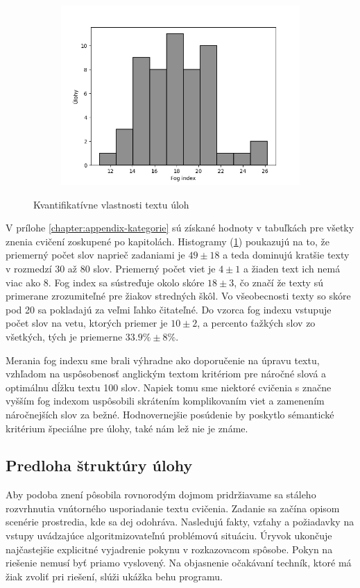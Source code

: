 \begin{figure}[h]
\begin{subfigure}[b]{0.32\textwidth}
\includegraphics[width=\textwidth]{assets/fog.png}
\end{subfigure}
\hfill
\caption{Kvantifikatívne vlastnosti textu úloh}
\label{fig:text-metrics}
\end{figure}

V prílohe \ref{chapter:appendix-kategorie} sú získané hodnoty v tabuľkách pre všetky znenia cvičení zoskupené po kapitolách. Histogramy (\ref{fig:text-metrics}) poukazujú na to, že priemerný počet slov naprieč zadaniami je $49 \pm 18$ a teda dominujú kratšie texty v rozmedzí $30$ až $80$ slov. Priemerný počet viet je $4 \pm 1$ a žiaden text ich nemá viac ako $8$. Fog index sa sústreďuje okolo skóre $18 \pm 3$, čo značí že texty sú primerane zrozumiteľné pre žiakov stredných škôl. Vo všeobecnosti texty so skóre pod 20 sa pokladajú za veľmi ľahko čitateľné. Do vzorca fog indexu vstupuje počet slov na vetu, ktorých priemer je $10 \pm 2$, a percento ťažkých slov zo všetkých, tých je priemerne $33.9\% \pm 8\%$.

Merania fog indexu sme brali výhradne ako doporučenie na úpravu textu, vzhľadom na uspôsobenosť anglickým textom kritériom pre náročné slová a optimálnu dĺžku textu 100 slov. Napiek tomu sme niektoré cvičenia s značne vyšším fog indexom uspôsobili skrátením komplikovaním viet a zamenením náročnejších slov za bežné. Hodnovernejšie posúdenie by poskytlo sémantické kritérium špeciálne pre úlohy, také nám lež nie je známe.

\subsection{Predloha štruktúry úlohy}
Aby podoba znení pôsobila rovnorodým dojmom pridržiavame sa stáleho rozvrhnutia vnútorného usporiadanie textu cvičenia. Zadanie sa začína opisom scenérie prostredia, kde sa dej odohráva. Nasledujú fakty, vzťahy a požiadavky na vstupy uvádzajúce algoritmizovateľnú problémovú situáciu. Úryvok ukončuje najčastejšie explicitné vyjadrenie pokynu v rozkazovacom spôsobe. Pokyn na riešenie nemusí byť priamo vyslovený. Na objasnenie očakávaní techník, ktoré má žiak zvoliť pri riešení, slúži ukážka behu programu.

